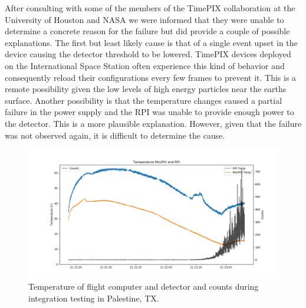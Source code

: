 After consulting with some of the members of the TimePIX collaboration at the University of Houston and NASA we were informed that they were unable to determine a concrete reason for the failure but did provide a couple of possible explanations. The first but least likely cause is that of a single event upset in the device causing the detector threshold to be lowered. TimePIX devices deployed on the International Space Station often experience this kind of behavior and consequently reload their configurations every few frames to prevent it. This is a remote possibility given the low levels of high energy particles near the earths surface. Another possibility is that the temperature changes caused a partial failure in the power supply and the RPI was unable to provide enough power to the detector. This is a more plausible explanation. However, given that the failure was not observed again, it is difficult to determine the cause.
%
\begin{figure}[H]
	\begin{center}
	\includegraphics[width=\textwidth]{figures/tempsandcountsvtime.png}
	\caption{Temperature of flight computer and detector and counts during integration testing in Palestine, TX.}
	\label{fig:integrationtemps}
	\end{center}
\end{figure}
